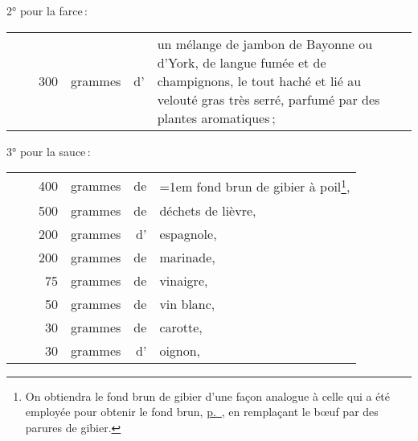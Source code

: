 2° pour la farce :

\footnotesize
\begin{longtable}{rrrrrp{18em}}
  & \hspace{2em} & 300 & grammes & d' & un mélange de jambon de Bayonne ou d'York, de langue
                         fumée et de champignons, le tout haché et lié au velouté gras très
                         serré, parfumé par des plantes aromatiques ;                                     \\
\end{longtable}
\normalsize

3° pour la sauce :

\footnotesize
\begin{longtable}{rrrrrp{18em}}
  & \hspace{2em}  & 400 & grammes & de & \hangindent=1em  fond brun de gibier à poil\footnote{\index{Fond brun de gibier}
                                                  On obtiendra le fond brun de gibier d'une façon analogue à
                                                  celle qui a été employée pour obtenir le fond brun, 
                                                  \hyperlink{p0203}{p. \pageref{pg0203}}, en remplaçant le bœuf par des 
                                                  parures de gibier.},                                    \\
  & \hspace{2em} & 500 & grammes & de & déchets de lièvre,                                                \\
  & \hspace{2em} & 200 & grammes & d' & espagnole,                                                        \\
  & \hspace{2em} & 200 & grammes & de & marinade,                                                         \\
  & \hspace{2em} &  75 & grammes & de & vinaigre,                                                         \\
  & \hspace{2em} &  50 & grammes & de & vin blanc,                                                        \\
  & \hspace{2em} &  30 & grammes & de & carotte,                                                          \\
  & \hspace{2em} &  30 & grammes & d' & oignon,                                                           \\

\end{longtable}
